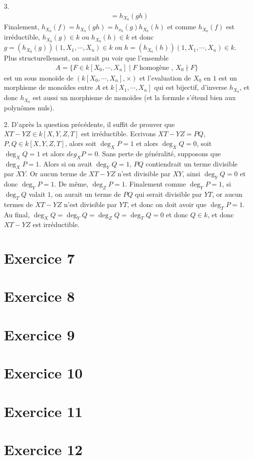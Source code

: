 \begin{question}{3.}
\begin{align*}
                &= h_{X_0}(gh)
            \end{align*}
            Finalement, $h_{X_0}(f) = h_{X_0}(gh) = h_{x_0}(g)h_{X_0}(h)$ et comme $h_{X_0}(f)$ est irréductible, $h_{X_0}(g) \in k$ ou $h_{X_0}(h) \in k$ et donc $g = (h_{X_0}(g))(1, X_1, \cdots, X_n) \in k$ ou $h =( h_{X_0}(h))(1, X_1, \cdots, X_n) \in k$. Plus structurellement, on aurait pu voir que l'ensemble
            \begin{align*}
                A = \{F \in k[X_0, \cdots, X_n] \mid F \text{ homogène },\, X_0 \nmid F\}
            \end{align*}
            est un sous monoïde de $(k[X_0, \cdots, X_n], \times)$ et l'evaluation de $X_0$ en $1$ est un morphisme de monoïdes entre $A$ et $k[X_1, \cdots, X_n]$ qui est bijectif, d'inverse $h_{X_0}$, et donc $h_{X_0}$ est aussi un morphisme de monoïdes (et la formule s'étend bien aux polynômes nuls). 
        \end{question}
        \begin{question}{2.}
            D'après la question précédente, il suffit de prouver que $XT - YZ \in k[X,Y,Z,T]$ est irréductible. Ecrivons $XT - YZ = PQ$, $P,Q \in k[X,Y,Z,T]$, alors soit $\deg_X P = 1$ et alors $\deg_X Q = 0$, soit $\deg_X Q = 1$ et alors $deg_X P = 0$. Sans perte de généralité, supposons que $\deg_X P = 1$. Alors si on avait $\deg_Y Q = 1$, $PQ$ contiendrait un terme divisible par $XY$. Or aucun terme de $XT - YZ$ n'est divisible par $XY$, ainsi $\deg_Y Q = 0$ et donc $\deg_Y P = 1$. De même, $\deg_Z P = 1$. Finalement comme $\deg_Y P = 1$, si $\deg_T Q$ valait $1$, on aurait un terme de $PQ$ qui serait divisible par $YT$, or aucun termes de $XT - YZ$ n'est divisible par $YT$, et donc on doit avoir que $\deg_T P = 1$. Au final, $\deg_X Q = \deg_Y Q = \deg_Z Q = \deg_T Q = 0$ et donc $Q \in k$, et donc $XT - YZ$ est irréductible.
        \end{question}



    \section{Exercice 7}

    \section{Exercice 8}

    \section{Exercice 9}

    \section{Exercice 10}

    \section{Exercice 11}

    \section{Exercice 12}